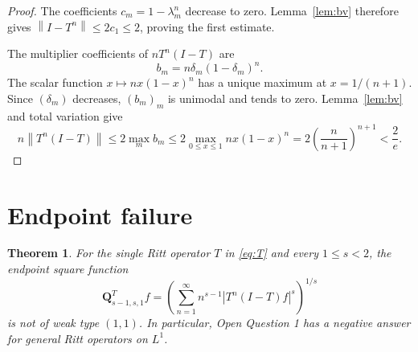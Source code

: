 \documentclass[11pt]{article}
\newtheorem{theorem}{Theorem}
\theoremstyle{remark}
\newcommand{\norm}[1]{\left\lVert#1\right\rVert}
\begin{document}
\begin{proof}
The coefficients $c_m=1-\lambda_m^n$ decrease to zero.  Lemma~\ref{lem:bv}
therefore gives $\norm{I-T^n}\leq2c_1\leq2$, proving the first estimate.

The multiplier coefficients of $nT^n(I-T)$ are
\[
 b_m=n\delta_m(1-\delta_m)^n.
\]
The scalar function $x\mapsto nx(1-x)^n$ has a unique maximum at
$x=1/(n+1)$.  Since $(\delta_m)$ decreases, $(b_m)_m$ is unimodal and tends
to zero.  Lemma~\ref{lem:bv} and total variation give
\[
 n\norm{T^n(I-T)}
 \leq2\max_m b_m
 \leq2\max_{0\leq x\leq1}nx(1-x)^n
 =2\left(\frac n{n+1}\right)^{n+1}<\frac2e.
\]
\end{proof}

\section{Endpoint failure}

\begin{theorem}\label{thm:main}
For the single Ritt operator $T$ in \eqref{eq:T} and every $1\leq s<2$,
the endpoint square function
\[
 \mathbf Q^T_{s-1,s,1}f
 =\left(\sum_{n=1}^{\infty}n^{s-1}|T^n(I-T)f|^s\right)^{1/s}
\]
is not of weak type $(1,1)$.  In particular, Open Question 1 has a negative
answer for general Ritt operators on $L^1$.
\end{theorem}
\end{document}
